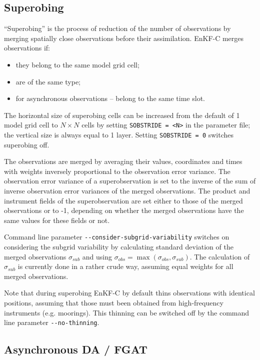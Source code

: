\documentclass[11pt]{report}
\begin{document}
\subsection{Superobing}

``Superobing'' is the process of reduction of the number of observations by merging spatially close observations before their assimilation.
EnKF-C merges observations if:
\begin{itemize}
\item they belong to the same model grid cell;
\item are of the same type;
\item for asynchronous observations -- belong to the same time slot.
\end{itemize}
The horizontal size of superobing cells can be increased from the default of 1 model grid cell to $N \times N$ cells by setting \verb|SOBSTRIDE = <N>| in the parameter file; the vertical size is always equal to 1 layer.
Setting \verb|SOBSTRIDE = 0| switches superobing off.

The observations are merged by averaging their values, coordinates and times with weights inversely proportional to the observation error variance.
The observation error variance of a superobservation is set to the inverse of the sum of inverse observation error variances of the merged observations.
The product and instrument fields of the superobservation are set either to those of the merged observations or to -1, depending on whether the merged observations have the same values for these fields or not.

Command line parameter \verb|--consider-subgrid-variability| switches on considering the subgrid variability by calculating standard deviation of the merged observations $\sigma\!_{sub}$ and using $\sigma\!_{obs} = \max(\sigma\!_{obs}, \sigma\!_{sub})$.
The calculation of $\sigma\!_{sub}$ is currently done in a rather crude way, assuming equal weights for all merged observations.

Note that during superobing EnKF-C by default thins observations with identical positions, assuming that those must been obtained from high-frequency instruments (e.g. moorings).
This thinning can be switched off by the command line parameter \verb|--no-thinning|.

\subsection{Asynchronous DA / FGAT}
\label{sec:async}
\end{document}
